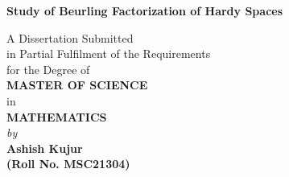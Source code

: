 \begin{titlepage}
\enlargethispage{3cm}

\begin{center}

\vspace*{-1cm}

\textbf{\Large Study of Beurling Factorization of Hardy Spaces}\\[10pt]

\vspace*{0.5cm}


A Dissertation Submitted \\
in Partial Fulfilment of the Requirements  \\
for the Degree of  \\
\vspace{5mm}
{\Large \bf MASTER OF SCIENCE } \\
in \\
{\large \bf MATHEMATICS } \\



                      \vspace{10mm}
                   {\em  by} \\ \vspace{3mm}
             {\large \bf Ashish Kujur} \\
{\large \bf (Roll No. MSC21304)}\\[.3in]


\end{center}
\end{titlepage}
